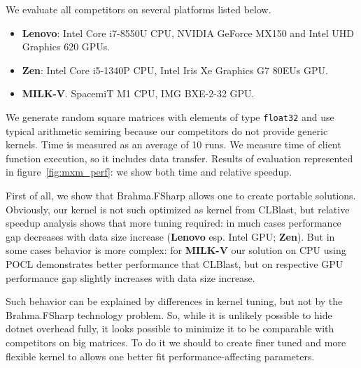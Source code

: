 We evaluate all competitors on several platforms listed below.
\begin{itemize}
  \item \textbf{Lenovo}: Intel Core i7-8550U CPU, NVIDIA GeForce MX150 and Intel UHD Graphics 620 GPUs.
  \item \textbf{Zen}: Intel Core i5-1340P CPU, Intel Iris Xe Graphics G7 80EUs GPU.
  \item \textbf{MILK-V}. SpacemiT M1 CPU, IMG BXE-2-32 GPU.
\end{itemize}

We generate random square matrices with elements of type \texttt{float32} and use typical arithmetic semiring because our competitors do not provide generic kernels.
Time is measured as an average of 10 runs.
We measure time of client function execution, so it includes data transfer.
Results of evaluation represented in figure~\ref{fig:mxm_perf}: we show both time and relative speedup.

First of all, we show that Brahma.FSharp allows one to create portable solutions.
Obviously, our kernel is not such optimized as kernel from CLBlast, but relative speedup analysis shows that more tuning required: in much cases performance gap decreases with data size increase (\textbf{Lenovo} esp. Intel GPU; \textbf{Zen}).
But in some cases behavior is more complex: for \textbf{MILK-V} our solution on CPU using POCL demonstrates better performance that CLBlast, but on respective GPU performance gap slightly increases with data size increase.

Such behavior can be explained by differences in kernel tuning, but not by the Brahma.FSharp technology problem.
So, while it is unlikely possible to hide dotnet overhead fully, it looks possible to minimize it to be comparable with competitors on big matrices.
To do it we should to create finer tuned and more flexible kernel to allows one better fit performance-affecting parameters.